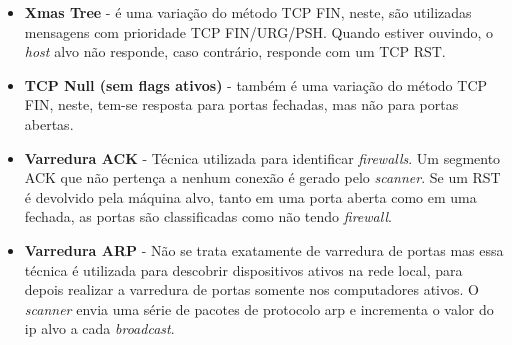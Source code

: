 \begin{itemize}
\item \textbf{Xmas Tree} - é uma variação do método TCP FIN, neste, são utilizadas mensagens com prioridade TCP FIN/URG/PSH. Quando estiver ouvindo, o \textit{host} alvo não responde, caso contrário, responde com um TCP RST. %

\item \textbf{TCP Null (sem flags ativos)} - também é uma variação do método TCP FIN, neste, tem-se resposta para portas fechadas, mas não para portas abertas.%

\item \textbf{Varredura ACK} - Técnica utilizada para identificar \textit{firewalls}. Um segmento ACK que não pertença a nenhum conexão é gerado pelo \textit{scanner}. Se um RST é devolvido pela máquina alvo, tanto em uma porta aberta como em uma fechada, as portas são classificadas como não tendo \textit{firewall}.

\item \textbf{Varredura ARP} - Não se trata exatamente de varredura de portas mas essa técnica é utilizada para descobrir dispositivos ativos na rede local, para depois realizar a varredura de portas somente nos computadores ativos. O \textit{scanner} envia uma série de pacotes de protocolo \gls{arp} \cite{RFC0826} e incrementa o valor do \gls{ip} alvo a cada \textit{broadcast}.
\end{itemize}

